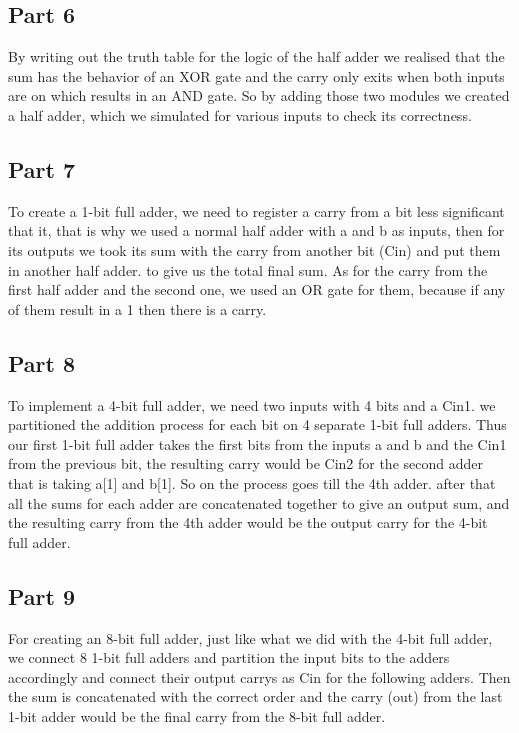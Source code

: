 \documentclass[pdftex,12pt,a4paper]{article}
\begin{document}
\subsection{Part 6}

By writing out the truth table for the logic of the half adder we realised that the sum has the behavior of an XOR gate and the carry only exits when both inputs are on which results in an AND gate. So by adding those two modules we created a half adder, which we simulated for various inputs to check its correctness.

\subsection{Part 7}

To create a 1-bit full adder, we need to register a carry from a bit less significant that it, that is why we used a normal half adder with a and b as inputs, then for its outputs we took its sum with the carry from another bit (Cin) and put them in another half adder. to give us the total final sum. As for the carry from the first half adder and the second one, we used an OR gate for them, because if any of them result in a 1 then there is a carry.

\subsection{Part 8}

To implement a 4-bit full adder, we need two inputs with 4 bits and a Cin1. we partitioned the addition process for each bit on 4 separate 1-bit full adders. Thus our first 1-bit full adder takes the first bits from the inputs a and b and the Cin1 from the previous bit, the resulting carry would be Cin2 for the second adder that is taking a[1] and b[1]. So on the process goes till the 4th adder. after that all the sums for each adder are concatenated together to give an output sum, and the resulting carry from the 4th adder would be the output carry for the 4-bit full adder.

\subsection{Part 9}

For creating an 8-bit full adder, just like what we did with the 4-bit full adder, we connect 8 1-bit full adders and partition the input bits to the adders accordingly and connect their output carrys as Cin for the following adders. Then the sum is concatenated with the correct order and the carry (out) from the last 1-bit adder would be the final carry from the 8-bit full adder. 
\end{document}
